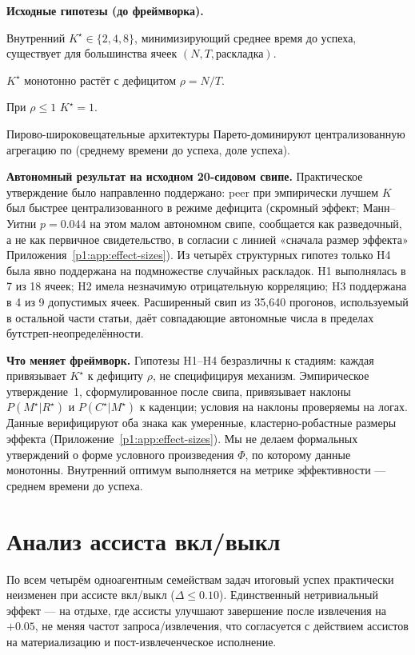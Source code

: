 \documentclass{article}
\begin{document}
\textbf{Исходные гипотезы (до фреймворка).}
\begin{description}[leftmargin=10pt,topsep=2pt,itemsep=1pt]
\item[H1.] Внутренний $K^\star \in \{2,4,8\}$, минимизирующий среднее время до успеха, существует для большинства ячеек $(N, T, \text{раскладка})$.
\item[H2.] $K^\star$ монотонно растёт с дефицитом $\rho = N/T$.
\item[H3.] При $\rho \le 1$ $K^\star = 1$.
\item[H4.] Пирово-широковещательные архитектуры Парето-доминируют централизованную агрегацию по (среднему времени до успеха, доле успеха).
\end{description}

\textbf{Автономный результат на исходном 20-сидовом свипе.}
Практическое утверждение было направленно поддержано: peer при эмпирически лучшем $K$ был быстрее централизованного в режиме дефицита (скромный эффект; Манн--Уитни $p{=}0.044$ на этом малом автономном свипе, сообщается как разведочный, а не как первичное свидетельство, в согласии с линией «сначала размер эффекта» Приложения~\ref{p1:app:effect-sizes}). Из четырёх структурных гипотез только H4 была явно поддержана на подмножестве случайных раскладок. H1 выполнялась в 7 из 18 ячеек; H2 имела незначимую отрицательную корреляцию; H3 поддержана в 4 из 9 допустимых ячеек. Расширенный свип из 35{,}640 прогонов, используемый в остальной части статьи, даёт совпадающие автономные числа в пределах бутстреп-неопределённости.

\textbf{Что меняет фреймворк.}
Гипотезы H1--H4 безразличны к стадиям: каждая привязывает $K^\star$ к дефициту $\rho$, не специфицируя механизм. Эмпирическое утверждение~1, сформулированное после свипа, привязывает наклоны $P(M^\star|R^\star)$ и $P(C^\star|M^\star)$ к каденции; условия на наклоны проверяемы на логах. Данные верифицируют оба знака как умеренные, кластерно-робастные размеры эффекта (Приложение~\ref{p1:app:effect-sizes}). Мы не делаем формальных утверждений о форме условного произведения $\Phi$, по которому данные монотонны. Внутренний оптимум выполняется на метрике эффективности --- среднем времени до успеха.

\section{Анализ ассиста вкл/выкл}
\label{p1:app:assist}

По всем четырём одноагентным семействам задач итоговый успех практически неизменен при ассисте вкл/выкл ($\Delta \le 0.10$). Единственный нетривиальный эффект --- на отдыхе, где ассисты улучшают завершение после извлечения на~$+0.05$, не меняя частот запроса/извлечения, что согласуется с действием ассистов на материализацию и пост-извлеченческое исполнение.
\end{document}
